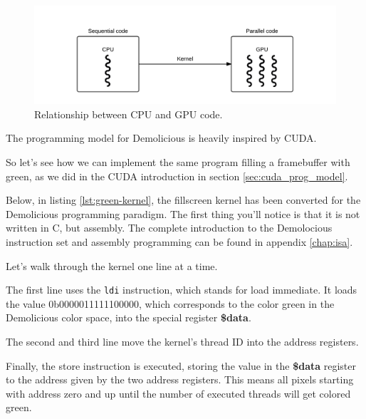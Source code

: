 \documentclass[../main/report.tex]{subfiles}
\begin{document}
\begin{figure}[H]
	\centering
	\includegraphics[width=\textwidth]{../system_overview/diagrams/programming_model_cpu_gpu.png}
	\caption{Relationship between CPU and GPU code.}
	\label{fig:programming_model_cpu_gpu}
\end{figure}

The programming model for Demolicious is heavily inspired by CUDA.

So let's see how we can implement the same program filling a framebuffer with green, as we did in the CUDA introduction in section \ref{sec:cuda_prog_model}.

Below, in listing \ref{lst:green-kernel}, the fillscreen kernel has been converted for the Demolicious programming paradigm.
The first thing you'll notice is that it is not written in C, but assembly.
The complete introduction to the Demolocious instruction set and assembly programming can be found in appendix \ref{chap:isa}.


Let's walk through the kernel one line at a time.

The first line uses the \verb/ldi/ instruction, which stands for load immediate.
It loads the value 0b0000011111100000,
which corresponds to the color green in the Demolicious color space,
into the special register \textbf{\$data}.

The second and third line move the kernel's thread ID into the address registers.

Finally, the store instruction is executed, storing the value in the \textbf{\$data} register
to the address given by the two address registers.
This means all pixels starting with address zero and up until the number of executed threads
will get colored green.
\end{document}

